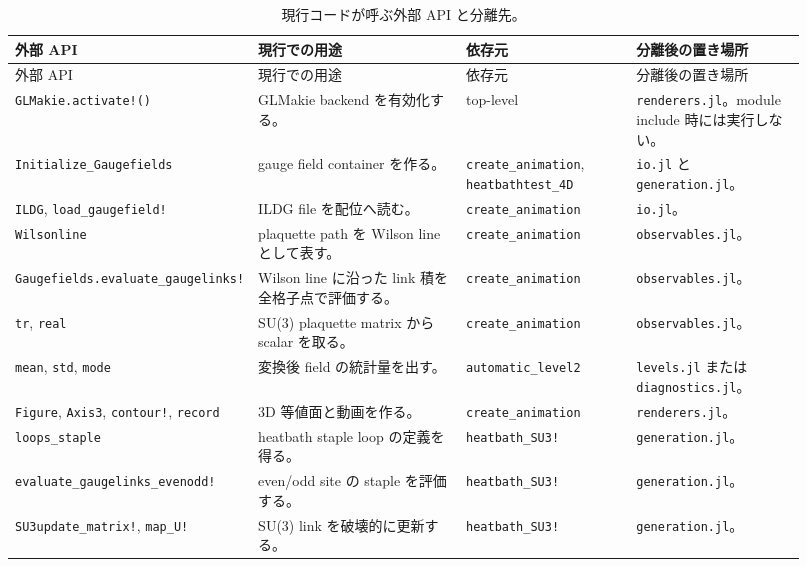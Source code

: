 \documentclass[uplatex,dvipdfmx,ja=standard,11pt,a4paper]{bxjsarticle}
\newcommand{\code}[1]{\texttt{#1}}
\begin{document}
{\small
\begin{longtable}{p{0.20\linewidth}p{0.28\linewidth}p{0.22\linewidth}p{0.22\linewidth}}
\caption{現行コードが呼ぶ外部 API と分離先。}\label{tab:external-deps}\\
\toprule
外部 API & 現行での用途 & 依存元 & 分離後の置き場所 \\
\midrule
\endfirsthead
\toprule
外部 API & 現行での用途 & 依存元 & 分離後の置き場所 \\
\midrule
\endhead
\code{GLMakie.activate!()} & GLMakie backend を有効化する。 & top-level & \code{renderers.jl}。module include 時には実行しない。 \\
\code{Initialize\_}\newline\code{Gaugefields} & gauge field container を作る。 & \code{create\_animation}, \code{heatbathtest\_4D} & \code{io.jl} と \code{generation.jl}。 \\
\code{ILDG}, \code{load\_gaugefield!} & ILDG file を配位へ読む。 & \code{create\_animation} & \code{io.jl}。 \\
\code{Wilsonline} & plaquette path を Wilson line として表す。 & \code{create\_animation} & \code{observables.jl}。 \\
\code{Gaugefields.}\newline\code{evaluate\_gaugelinks!} & Wilson line に沿った link 積を全格子点で評価する。 & \code{create\_animation} & \code{observables.jl}。 \\
\code{tr}, \code{real} & SU(3) plaquette matrix から scalar を取る。 & \code{create\_animation} & \code{observables.jl}。 \\
\code{mean}, \code{std}, \code{mode} & 変換後 field の統計量を出す。 & \code{automatic\_level2} & \code{levels.jl} または \code{diagnostics.jl}。 \\
\code{Figure}, \code{Axis3}, \code{contour!}, \code{record} & 3D 等値面と動画を作る。 & \code{create\_animation} & \code{renderers.jl}。 \\
\code{loops\_staple} & heatbath staple loop の定義を得る。 & \code{heatbath\_SU3!} & \code{generation.jl}。 \\
\code{evaluate\_}\newline\code{gaugelinks\_evenodd!} & even/odd site の staple を評価する。 & \code{heatbath\_SU3!} & \code{generation.jl}。 \\
\code{SU3update\_}\newline\code{matrix!}, \code{map\_U!} & SU(3) link を破壊的に更新する。 & \code{heatbath\_SU3!} & \code{generation.jl}。 \\

\end{longtable}}
\end{document}
